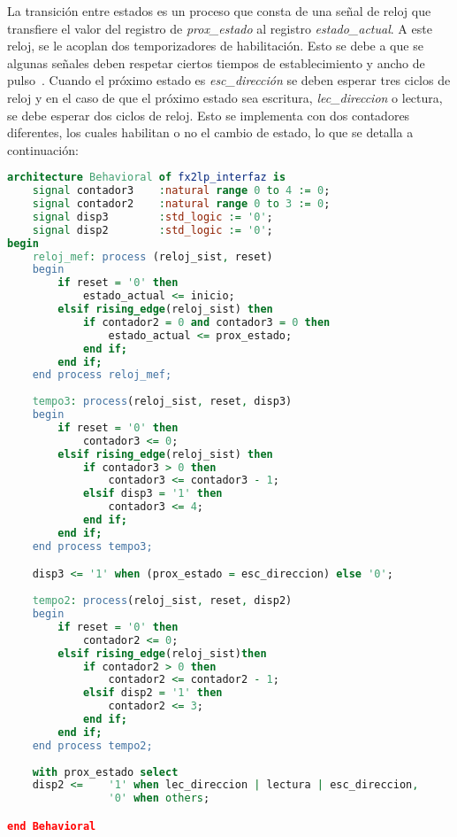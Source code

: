 La transición entre estados es un proceso que consta de una señal de reloj que transfiere el valor del registro de \textit{prox\_estado} al registro \textit{estado\_actual}. A este reloj, se le acoplan dos temporizadores de habilitación. Esto se debe a que se algunas señales deben respetar ciertos tiempos de establecimiento y ancho de pulso~\cite{Cypress2017}. Cuando el próximo estado es \textit{esc\_dirección} se deben esperar tres ciclos de reloj y en el caso de que el próximo estado sea escritura, \textit{lec\_direccion} o lectura, se debe esperar dos ciclos de reloj.
Esto se implementa con dos contadores diferentes, los cuales habilitan o no el cambio de estado, lo que se detalla a continuación:

\begin{lstlisting}[language=VHDL,backgroundcolor=\color{gray!30}]
architecture Behavioral of fx2lp_interfaz is
	signal contador3	:natural range 0 to 4 := 0;
	signal contador2	:natural range 0 to 3 := 0;
	signal disp3		:std_logic := '0';
	signal disp2		:std_logic := '0';
begin
	reloj_mef: process (reloj_sist, reset)
	begin
		if reset = '0' then
			estado_actual <= inicio;
		elsif rising_edge(reloj_sist) then
			if contador2 = 0 and contador3 = 0 then
				estado_actual <= prox_estado;
			end if;
		end if;
	end process reloj_mef;
	
	tempo3: process(reloj_sist, reset, disp3)
	begin
		if reset = '0' then
			contador3 <= 0;
		elsif rising_edge(reloj_sist) then
			if contador3 > 0 then
				contador3 <= contador3 - 1;
			elsif disp3 = '1' then
				contador3 <= 4;
			end if;
		end if;
	end process tempo3;

	disp3 <= '1' when (prox_estado = esc_direccion) else '0';
	
	tempo2: process(reloj_sist, reset, disp2)
	begin
		if reset = '0' then
			contador2 <= 0;
		elsif rising_edge(reloj_sist)then
			if contador2 > 0 then
				contador2 <= contador2 - 1;
			elsif disp2 = '1' then
				contador2 <= 3;
			end if;
		end if;
	end process tempo2;
	
	with prox_estado select
	disp2 <=	'1' when lec_direccion | lectura | esc_direccion,
				'0' when others;

end Behavioral
\end{lstlisting}